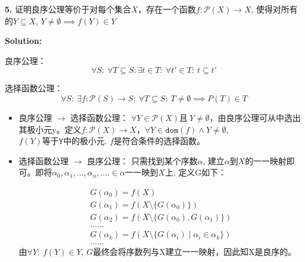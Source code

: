 \documentclass[UTF8, 9pt, a4paper]{ctexart}
\newcommand{\ksec}[2]{\noindent \textbf{\large #1} #2\par}
\newcommand{\ksolve}{\noindent\textbf{\large Solution: }\par}
\begin{document}
	\vspace{0.5cm}
	
	\ksec{5. }{证明良序公理等价于对每个集合$ X $，存在一个函数$ f: \mathcal{P}(X) \rightarrow X $, 使得对所有的$ Y \subseteq X $, $ Y \neq \emptyset \implies f(Y) \in Y$}
	\ksolve
	
	良序公理：
		$$ \forall S:\ \forall T \subseteq  S:\exists t \in T :\ \forall t'\in T:\ t \subseteq t' $$
	
	选择函数公理：
		$$ \forall S:\ \exists f: \mathcal{P}(S) \rightarrow S:\ \forall T \subseteq S:\ T \neq \emptyset \implies P(T) \in T $$
	
	\begin{itemize}
		\item 良序公理 $\rightarrow$ 选择函数公理：
		$ \forall Y \in \mathcal{P}(X)$且$\ Y \neq \emptyset $，由良序公理可从中选出其极小元y。定义$ f: \mathcal{P}(X) \rightarrow X $，$ \forall Y \in \texttt{dom}(f) \land Y \neq \emptyset$, $ f(Y) \texttt{等于Y中的极小元}$. $ f $是符合条件的选择函数。
		
		\item 选择函数公理 $ \rightarrow $ 良序公理：
			只需找到某个序数$ \alpha $, 建立$ \alpha $到$ X $的一一映射即可。即将$ \alpha_0, \alpha_1, ..., \alpha_n, .... \in \alpha $一一映到$ X $上, 定义G如下：
			
			$$ \begin{array}{ll}
				G(\alpha_0) = f(X) \\
				G(\alpha_1) = f(X \setminus \{ G(\alpha_0)\}) \\
				G(\alpha_2) = f(X \setminus \{ G(\alpha_0), G(\alpha_1) \}) \\
				......\\
				G(\alpha_k) = f(X \setminus \{ G(\alpha_i) \mid \alpha_i \in \alpha_k \}) \\
				......
			\end{array}$$
		由$ \forall Y:\ f(Y) \in Y $, $ G $最终会将序数列与X建立一一映射，因此知X是良序的。
		
		
		\begin{comment}
		$$\begin{array}{l}
			\texttt{对}X: \exists (f_0 \in \mathcal{P}(X) \rightarrow X) :\ \forall Y \subseteq X:\ Y \neq \emptyset \implies f_0(Y) \in Y\\
			\texttt{对}\mathcal{P}(X): \exists (f_1 \in \mathcal{P}(\mathcal{P}(X)) \rightarrow \mathcal{P}(X)) :\ \forall Y \subseteq \mathcal{P}(X):\ Y \neq \emptyset \implies f_1(Y) \in Y\\
			\texttt{对}\mathcal{P}(X): ......\\
			\texttt{对}\mathcal{P_\omega}(X): \exists (f_\omega \in \mathcal{P_{\omega}^1} (X) \rightarrow \mathcal{P}_\omega(X)) :\ \forall Y \subseteq \mathcal{P}_\omega(X):\ Y \neq \emptyset \implies f_\omega(Y) \in Y\\
			......
		\end{array}
		$$
		定义$ f: \mathcal{P}_\omega(X) \rightarrow X $
		$$ f = f_0 \circ f_1 \circ ... \circ f_\omega $$
		

\end{comment}
\end{itemize}
\end{document}
